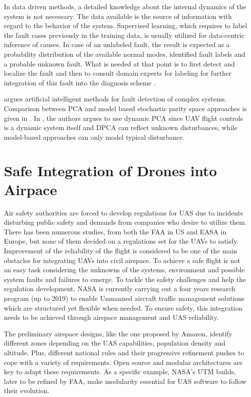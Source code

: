 In data driven methods, a detailed knowledge about the internal dynamics 
of the system is not necessary. The data available is the source of information 
with regard to the behavior of the system. Supervised learning, which requires 
to label the fault cases previously in the training data, is usually utilized for 
data-centric inference of causes. In case of an unlabeled fault, the result is 
expected as a probability distribution of the available normal modes, identified 
fault labels and a probable unknown fault. What is needed at that point is to 
first detect and localize the fault and then to consult domain experts for labeling 
for further integration of this fault into the diagnosis scheme \cite{dataCentricDiagOffline}.

\cite{gui2002fault} argues artificial intelligent methods for fault detection of complex 
systems. Comparison between PCA and model based stochastic parity space 
approaches is given in \cite{hagenblad2004comparison}.
In \cite{li2016data}, the authors argues to use dynamic PCA since UAV flight 
controls is a dynamic system itself and DPCA can reflect unknown disturbances, 
while model-based approaches can only model typical disturbance.  


\section{Safe Integration of Drones into Airpace}
Air safety authorities are forced to develop regulations for UAS due to incidents 
disturbing public safety and demands from companies who desire to utilize them. 
There has been numerous studies, from both the FAA in US and EASA in Europe, 
but none of them decided on a regulations set for the UAVs to satisfy. Improvement 
of the reliability of the flight is considered to be one of the main obstacles for 
integrating UAVs into civil airspace. To achieve a safe flight is not an easy task 
considering the unknowns of the systems, environment and possible system faults 
and failures to emerge. To tackle the safety challenges and help the regulation 
development, NASA is currently carrying out a four years research program (up to 2019) 
to enable Unmanned aircraft traffic management solutions which are structured yet 
flexible when needed. To ensure safety, this integration needs to be achieved through 
airspace management and UAS reliability.

The preliminary airspace designs, like the one proposed by Amazon, identify different 
zones depending on the UAS capabilities, population density and altitude. Plus, 
different national rules and their progressive refinement pushes to cope with a variety 
of requirements. Open source and modular architectures are key to adapt these 
requirements. As a specific example, NASA's UTM builds, later to be refined by FAA, 
make modularity essential for UAS software to follow their evolution. 

